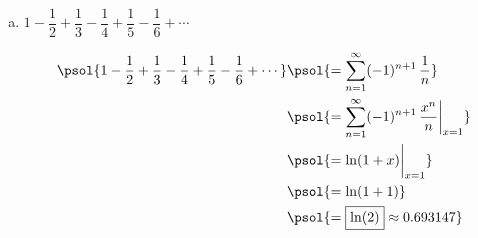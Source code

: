 \documentclass[12pt,letterpaper]{exam}
\begin{document}
\begin{questions}
\begin{enumerate}[(a)]
\item $1 - \dfrac{1}{2} + \dfrac{1}{3} - \dfrac{1}{4} + \dfrac{1}{5} - \dfrac{1}{6} + \cdots$ \par\vspace{0.3cm}
\psol{\itshape\small We know that $\ds\ln(1 + x)= \sum_{n=1}^\infty (-1)^{n+1}\, \dfrac{x^n}{n}$ for $x \in (-1, 1]$. But $x= 1 \in (-1, 1]$, so that\dots}
	\[
	\begin{aligned}
	\psol{1 - \dfrac{1}{2} + \dfrac{1}{3} - \dfrac{1}{4} + \dfrac{1}{5} - \dfrac{1}{6} + \cdots}&\psol{= \sum_{n=1}^\infty (-1)^{n+1}\, \dfrac{1}{n}} \\
	&\psol{= \sum_{n=1}^\infty (-1)^{n+1}\, \dfrac{x^n}{n} \bigg|_{x=1}} \\
	&\psol{= \ln(1 + x) \bigg|_{x=1}} \\
	&\psol{= \ln(1 + 1)} \\
	&\psol{= \boxed{\ln(2)} \approx 0.693147}
	\end{aligned}
	\]
\end{enumerate}

\end{questions}
\end{document}

